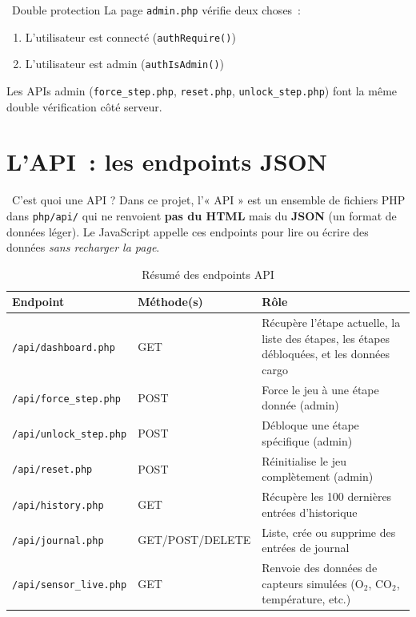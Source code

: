 \documentclass[12pt,a4paper]{article}
\begin{document}
\begin{warningbox}{\faLock\ Double protection}
La page \texttt{admin.php} vérifie deux choses~:
\begin{enumerate}
    \item L'utilisateur est connecté (\texttt{authRequire()})
    \item L'utilisateur est admin (\texttt{authIsAdmin()})
\end{enumerate}
Les APIs admin (\texttt{force\_step.php}, \texttt{reset.php}, \texttt{unlock\_step.php}) font la même double vérification côté serveur.
\end{warningbox}

\section{L'API~: les endpoints JSON}

\begin{conceptbox}{\faCogs\ C'est quoi une API ?}
Dans ce projet, l'« API » est un ensemble de fichiers PHP dans \texttt{php/api/} qui ne renvoient \textbf{pas du HTML} mais du \textbf{JSON} (un format de données léger). Le JavaScript appelle ces endpoints pour lire ou écrire des données \textit{sans recharger la page}.
\end{conceptbox}

\begin{table}[h!]
\centering
\begin{tabularx}{\textwidth}{llX}
    \toprule
    \textbf{Endpoint} & \textbf{Méthode(s)} & \textbf{Rôle} \\
    \midrule
    \texttt{/api/dashboard.php} & GET & Récupère l'étape actuelle, la liste des étapes, les étapes débloquées, et les données cargo \\
    \texttt{/api/force\_step.php} & POST & Force le jeu à une étape donnée (admin) \\
    \texttt{/api/unlock\_step.php} & POST & Débloque une étape spécifique (admin) \\
    \texttt{/api/reset.php} & POST & Réinitialise le jeu complètement (admin) \\
    \texttt{/api/history.php} & GET & Récupère les 100 dernières entrées d'historique \\
    \texttt{/api/journal.php} & GET/POST/DELETE & Liste, crée ou supprime des entrées de journal \\
    \texttt{/api/sensor\_live.php} & GET & Renvoie des données de capteurs simulées (O$_2$, CO$_2$, température, etc.) \\
    \bottomrule
\end{tabularx}
\caption{Résumé des endpoints API}
\end{table}
\end{document}
